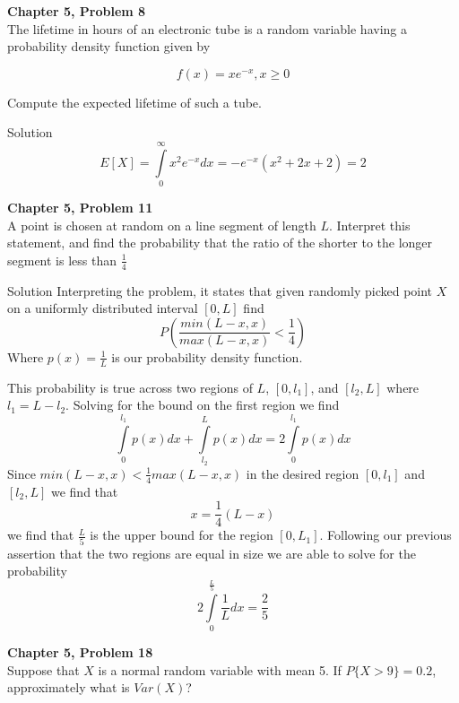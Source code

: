 \documentclass{article}
\begin{document}
\begin{spacing}{1.1}
\newpage
\begin{homeworkProblem}
  {\bf Chapter 5, Problem 8}\\
   The lifetime in hours of an electronic tube is a random variable 
    having a probability density function given by
  
  \[f(x) = x e^{-x}, x \ge 0\]

  Compute the expected lifetime of such a tube.
  \begin{homeworkSection}{Solution}
    \[E[X] = \int\limits_0^{\infty} x^2 e^{-x} dx = -e^{-x} ( x^2 + 2x + 2) = 2\]

  \end{homeworkSection}
\end{homeworkProblem}

\newpage
\begin{homeworkProblem}
  {\bf Chapter 5, Problem 11}\\
  A point is chosen at random on a line segment of length $L$. Interpret 
  this statement, and find the probability that the ratio of the shorter 
  to the longer segment is less than $\frac{ 1}{ 4}$
  \begin{homeworkSection}{Solution}
    Interpreting the problem, it states that given randomly picked point $X$
    on a uniformly distributed interval $[0,L]$ find
      \[P\left( \frac{ min( L - x, x)}{ max(L - x, x)} < \frac{ 1}{ 4}\right)\]
    Where $p(x) = \frac{ 1}{ L}$ is our probability density function.

    This probability is true across two regions of $L$, $[0, l_1]$, and $[l_2, L]$
    where $ l_1 = L - l_2$.  Solving for the bound on the first region we find
      \[\int\limits_{0}^{l_1} p(x) dx + \int\limits_{l_2}^{L} p(x) dx 
      = 2 \int\limits_{0}^{l_1} p(x) dx\]
    Since $min(L - x, x) < \frac{ 1}{ 4} max(L - x, x)$ in the desired region
    $[0,l_1]$ and $[l_2, L]$ we find that 
      \[x = \frac{ 1}{ 4} ( L - x)\]
    we find that $\frac{ L}{ 5}$ is the upper bound for the region $[0, L_1]$.  Following
    our previous assertion that the two regions are equal in size we are able to solve
    for the probability 
      \[ 2 \int\limits_{0}^{\frac{ L}{ 5}} \frac{ 1}{ L} dx = \frac{ 2}{ 5}\]

  \end{homeworkSection}
\end{homeworkProblem}
  
\newpage
\begin{homeworkProblem}
  {\bf Chapter 5, Problem 18}\\
  Suppose that $X$ is a normal random variable with mean 5. If $P\{X > 9\} = 0.2$, 
  approximately what is $Var( X)$?


\end{homeworkProblem}
\end{spacing}
\end{document}
